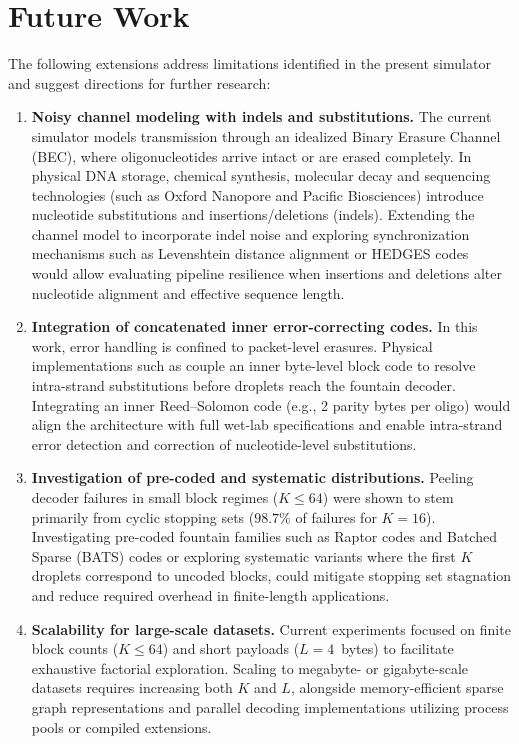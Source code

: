 \chapter{Future Work}
\label{chap:future_work}

The following extensions address limitations identified in the present simulator and suggest directions for further research:

\begin{enumerate}
    \item \textbf{Noisy channel modeling with indels and substitutions.}
    The current simulator models transmission through an idealized Binary Erasure Channel (BEC), where oligonucleotides arrive intact or are erased completely. In physical DNA storage, chemical synthesis, molecular decay and sequencing technologies (such as Oxford Nanopore and Pacific Biosciences) introduce nucleotide substitutions and insertions/deletions (indels). Extending the channel model to incorporate indel noise and exploring synchronization mechanisms such as Levenshtein distance alignment or HEDGES codes~\cite{press2020} would allow evaluating pipeline resilience when insertions and deletions alter nucleotide alignment and effective sequence length.

    \item \textbf{Integration of concatenated inner error-correcting codes.}
    In this work, error handling is confined to packet-level erasures. Physical implementations such as  couple an inner byte-level block code to resolve intra-strand substitutions before droplets reach the fountain decoder. Integrating an inner Reed--Solomon code (e.g., 2 parity bytes per oligo) would align the architecture with full wet-lab specifications and enable intra-strand error detection and correction of nucleotide-level substitutions.

    \item \textbf{Investigation of pre-coded and systematic distributions.}
    Peeling decoder failures in small block regimes ($K \le 64$) were shown to stem primarily from cyclic stopping sets ($98.7\%$ of failures for $K=16$). Investigating pre-coded fountain families such as Raptor codes and Batched Sparse (BATS) codes or exploring systematic variants where the first $K$ droplets correspond to uncoded blocks, could mitigate stopping set stagnation and reduce required overhead in finite-length applications.

    \item \textbf{Scalability for large-scale datasets.}
    Current experiments focused on finite block counts ($K \le 64$) and short payloads ($L = 4$~bytes) to facilitate exhaustive factorial exploration. Scaling to megabyte- or gigabyte-scale datasets requires increasing both $K$ and $L$, alongside memory-efficient sparse graph representations and parallel decoding implementations utilizing process pools or compiled extensions.


\end{enumerate}
